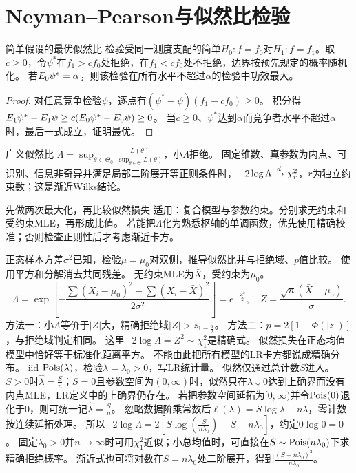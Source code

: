 \section{Neyman--Pearson与似然比检验}\label{sec:85}
\begin{theorem}{简单假设的最优似然比}
检验受同一测度支配的简单$H_0:f=f_0$对$H_1:f=f_1$。取$c\ge0$，令$\psi^*$在$f_1>cf_0$处拒绝，在$f_1<cf_0$处不拒绝，边界按预先规定的概率随机化。
若$E_0\psi^*=\alpha$，则该检验在所有水平不超过$\alpha$的检验中功效最大。
\end{theorem}
\begin{proof}
对任意竞争检验$\psi$，逐点有$(\psi^*-\psi)(f_1-cf_0)\ge0$。
积分得$E_1\psi^*-E_1\psi\ge c(E_0\psi^*-E_0\psi)\ge0$。
当$c\ge0$、$\psi^*$达到$\alpha$而竞争者水平不超过$\alpha$时，最后一式成立，证明最优。
\end{proof}
\begin{definition}{广义似然比}
$\Lambda=\sup_{\theta\in\Theta_0}\frac{L(\theta)}{\sup_{\theta\in\Theta}L(\theta)}$，小$\Lambda$拒绝。
固定维数、真参数为内点、可识别、信息非奇异并满足局部二阶展开等正则条件时，$-2\log\Lambda\xrightarrow{d}\chi_r^2$，$r$为独立约束数；这是渐近Wilks结论。
\end{definition}
\begin{method}{先做两次最大化，再比较似然损失}
适用：复合模型与参数约束。分别求无约束和受约束MLE，再形成比值。
若能把$\Lambda$化为熟悉枢轴的单调函数，优先使用精确校准；否则检查正则性后才考虑渐近卡方。
\end{method}
{正态样本方差$\sigma^2$已知，检验$\mu=\mu_0$对双侧，推导似然比并与拒绝域、$p$值比较。}
{使用平方和分解消去共同残差。}
{无约束MLE为$\bar X$，受约束为$\mu_0$。
\[\Lambda=\exp\!\left[-\dfrac{\sum(X_i-\mu_0)^2-\sum(X_i-\bar X)^2}{2\sigma^2}\right]
=e^{-\frac{Z^2}{2}},\quad Z=\dfrac{\sqrt n(\bar X-\mu_0)}\sigma.\]
方法一：小$\Lambda$等价于$|Z|$大，精确拒绝域$|Z|>z_{1-\frac{\alpha}{2}}$。
方法二：$p=2[1-\Phi(|z|)]$，与拒绝域判定相同。
这里$-2\log\Lambda=Z^2\sim\chi_1^2$是精确式。}
{似然损失在正态均值模型中恰好等于标准化距离平方。}
{不能由此把所有模型的LR卡方都说成精确分布。}
{iid $\operatorname{Pois}(\lambda)$，检验$\lambda=\lambda_0>0$，写LR统计量。}
{似然仅通过总计数$S$进入。}
{$S>0$时$\hat\lambda=\frac{S}{n}$；$S=0$且参数空间为$(0,\infty)$时，似然只在$\lambda\downarrow0$达到上确界而没有内点MLE，LR定义中的上确界仍存在。
若把参数空间延拓为$[0,\infty)$并令$\operatorname{Pois}(0)$退化于0，则可统一记$\hat\lambda=\frac{S}{n}$。
忽略数据阶乘常数后$\ell(\lambda)=S\log\lambda-n\lambda$，零计数按连续延拓处理。
所以$-2\log\Lambda=2[S\log(\frac{S}{n\lambda_0})-S+n\lambda_0]$，约定$0\log0=0$。
固定$\lambda_0>0$并$n\to\infty$时可用$\chi_1^2$近似；小总均值时，可直接在$S\sim\operatorname{Pois}(n\lambda_0)$下求精确拒绝概率。
渐近式也可将对数在$S=n\lambda_0$处二阶展开，得到$\frac{(S-n\lambda_0)^2}{n\lambda_0}$。}
